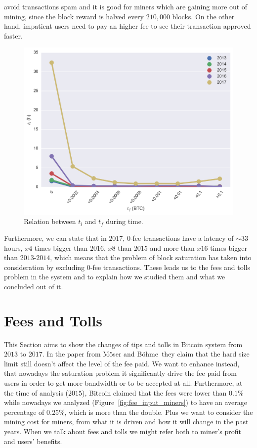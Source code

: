 \documentclass[USenglish]{uit-thesis}
\begin{document}
avoid transactions spam and it is good for miners which are gaining
more out of mining, since the block reward is halved every $210,000$
blocks. On the other hand, impatient users need to pay an higher fee to
see their transaction approved faster.
\begin{figure}[h]
	\centering
	\includegraphics[width=1\textwidth]{img/fee_latency}
	\caption{Relation between $t_l$ and $t_f$ during time.}
	\label{fig:fee_latency}
\end{figure}
Furthermore, we can state that in $2017$,
$0$-fee transactions have a latency of $\sim$$33$\,hours,
$x4$ times bigger than $2016$, $x8$ than $2015$ and more than $x16$
times bigger than $2013$-$2014$, which means that the problem
of block saturation has taken into consideration by excluding
$0$-fee transactions.
These leads us to the fees and tolls problem in the system and
to explain how we studied them and what we concluded out of it.

\section{Fees and Tolls}
\label{sec:feesandtolls}
This Section aims to show the changes of tips and tolls in Bitcoin
system from $2013$ to $2017$. In the paper from
Möser and Böhme\,\cite{Moser2015} they claim that
the hard size limit still doesn't affect the level of the fee paid.
We want to enhance instead, that nowadays the saturation
problem it significantly drive the fee paid
from users in order to get more bandwidth
or to be accepted at all. Furthermore, at the time
of analysis ($2015$), Bitcoin claimed that the fees were
lower than $0.1\%$ while nowadays
we analyzed (Figure~\ref{fig:fee_input_miners})
to have an average
percentage of $0.25$\%,
which is more than the double.
Plus we want to consider the mining cost
for miners, from what it is driven and how it will change
in the past years.
When we talk about fees and tolls we might refer both to miner's
profit and users' benefits.
\end{document}
